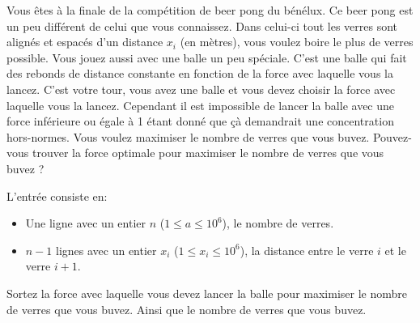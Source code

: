 \problemname{\problemyamlname}


\newcommand{\maxn}{10^{6}}

Vous êtes à la finale de la compétition de beer pong du bénélux. Ce beer pong est un peu différent de celui que vous connaissez. Dans celui-ci tout les verres sont alignés et espacés d'un distance $x_i$ (en mètres), vous voulez boire le plus de verres possible. Vous jouez aussi avec une balle un peu spéciale. C'est une balle qui fait des rebonds de distance constante en fonction de la force avec laquelle vous la lancez.
C'est votre tour, vous avez une balle et vous devez choisir la force avec laquelle vous la lancez. Cependant il est impossible de lancer la balle avec une force inférieure ou égale à 1 étant donné que çà demandrait une concentration hors-normes. Vous voulez maximiser le nombre de verres que vous buvez. Pouvez-vous trouver la force optimale pour maximiser le nombre de verres que vous buvez ?
\begin{Input}
    L'entrée consiste en:
    \begin{itemize}
        \item Une ligne avec un entier  $n$ ($1\leq a\leq \maxn$), le nombre de verres.
        \item $n-1$ lignes avec un entier $x_i$ ($1\leq x_i\leq \maxn$), la distance entre le verre $i$ et le verre $i+1$.
    \end{itemize}
\end{Input}

\begin{Output}
    Sortez la force avec laquelle vous devez lancer la balle pour maximiser le nombre de verres que vous buvez. Ainsi que le nombre de verres que vous buvez.
\end{Output}
